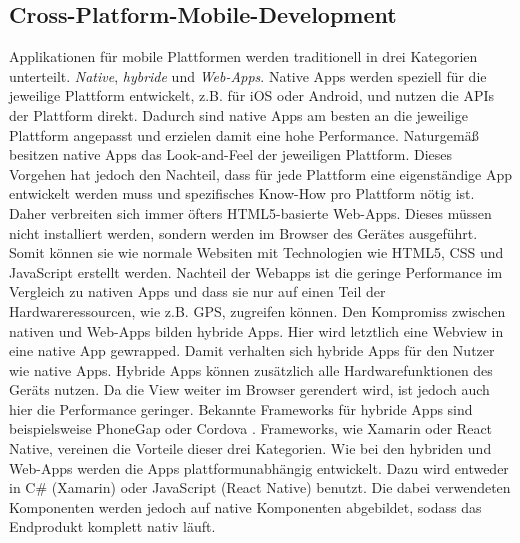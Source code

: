 % 


\subsection{Cross-Platform-Mobile-Development}
Applikationen für mobile Plattformen werden traditionell in drei Kategorien unterteilt. \textit{Native}, \textit{hybride} und \textit{Web-Apps}. Native Apps werden speziell für die jeweilige Plattform entwickelt, z.B. für iOS oder Android, und nutzen die APIs der Plattform direkt. Dadurch sind native Apps am besten an die jeweilige Plattform angepasst und erzielen damit eine hohe Performance. Naturgemäß besitzen native Apps das Look-and-Feel der jeweiligen Plattform. Dieses Vorgehen hat jedoch den Nachteil, dass für jede Plattform eine eigenständige App entwickelt werden muss und spezifisches Know-How pro Plattform nötig ist. Daher verbreiten sich immer öfters HTML5-basierte Web-Apps. Dieses müssen nicht installiert werden, sondern werden im Browser des Gerätes ausgeführt. Somit können sie wie normale Websiten mit Technologien wie HTML5, CSS und JavaScript erstellt werden. Nachteil der Webapps ist die geringe Performance im Vergleich zu nativen Apps und dass sie nur auf einen Teil der Hardwareressourcen, wie z.B. GPS, zugreifen können. Den Kompromiss zwischen nativen und Web-Apps bilden hybride Apps. Hier wird letztlich eine Webview in eine native App gewrapped. Damit verhalten sich hybride Apps für den Nutzer wie native Apps. Hybride Apps können zusätzlich alle Hardwarefunktionen des Geräts nutzen. Da die View weiter im Browser gerendert wird, ist jedoch auch hier die Performance geringer. Bekannte Frameworks für hybride Apps sind beispielsweise PhoneGap \cite{adobe_systems_inc._adobe_2016} oder Cordova \cite{the_apache_software_foundation_apache_2016}.
Frameworks, wie Xamarin \cite{xamarin_inc._xamarin_2016} oder React Native, vereinen die Vorteile dieser drei Kategorien. Wie bei den hybriden und Web-Apps werden die Apps plattformunabhängig entwickelt. Dazu wird entweder in C\# (Xamarin) oder JavaScript (React Native) benutzt. Die dabei verwendeten Komponenten werden jedoch auf native Komponenten abgebildet, sodass das Endprodukt komplett nativ läuft.